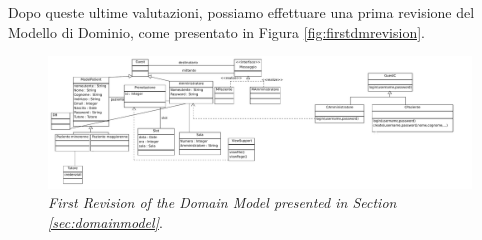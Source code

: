 Dopo queste ultime valutazioni, possiamo effettuare una prima revisione del
Modello di Dominio, come presentato in Figura \vref{fig:firstdmrevision}.

\begin{figure}[p]
\includegraphics[scale=0.5,angle=90]{svgs2/DomainModel01}
\caption{\textit{First Revision of the Domain Model presented in Section \vref{sec:domainmodel}}.}
\label{fig:firstdmrevision}
\end{figure} 
